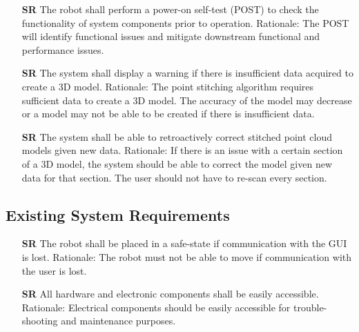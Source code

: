 \documentclass[12pt]{article}
\newcounter{srnum} %
\begin{document}
\begin{itemize}
\item[\textbf{SR\refstepcounter{srnum}\thesrnum \label{SR8}}] The robot shall perform a power-on self-test (POST) to check the functionality of system components prior to operation.
\newline Rationale: The POST will identify functional issues and mitigate downstream functional and performance issues.

\item[\textbf{SR\refstepcounter{srnum}\thesrnum \label{SR10}}] The system shall display a warning if there is insufficient data acquired to create a 3D model.
\newline Rationale: The point stitching algorithm requires sufficient data to create a 3D model. The accuracy of the model may decrease or a model may not be able to be created if there is insufficient data.

\item[\textbf{SR\refstepcounter{srnum}\thesrnum \label{SR11}}] The system shall be able to retroactively correct stitched point cloud models given new data.
\newline Rationale: If there is an issue with a certain section of a 3D model, the system should be able to correct the model given new data for that section. The user should not have to re-scan every section.

\end{itemize}

\subsection{Existing System Requirements}

\begin{itemize}

\item[\textbf{SR\refstepcounter{srnum}\thesrnum \label{SR4}}] The robot shall be placed in a safe-state if communication with the GUI is lost.
\newline Rationale: The robot must not be able to move if communication with the user is lost.

\item[\textbf{SR\refstepcounter{srnum}\thesrnum \label{SR9}}]All hardware and electronic components shall be easily accessible.
\newline Rationale: Electrical components should be easily accessible for trouble-shooting and maintenance purposes.

\end{itemize}
\end{document}
